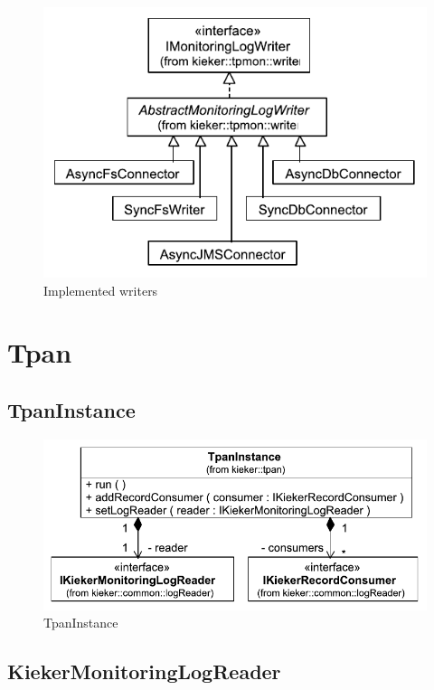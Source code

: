\documentclass[12pt,journal,a4paper,twocolumn,final,oneside]{IEEEtran}%
\begin{document}
\begin{figure}[h]\centering
\includegraphics[scale=0.65]{figures/model/kieker_writerimpls}%
\caption{Implemented writers}
\end{figure}

\section{Tpan}

\subsection{TpanInstance}

\begin{figure}[h]\centering
\includegraphics[scale=0.55]{figures/model/kieker_TpanInstance}%
\caption{TpanInstance}
\end{figure}

\subsection{KiekerMonitoringLogReader}
\end{document}
